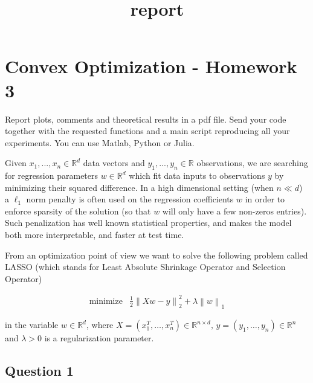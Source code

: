 \documentclass[11pt]{article}
\title{report}
\begin{document}
    
    \maketitle
    
    

    
    \hypertarget{convex-optimization---homework-3}{%
\section{Convex Optimization - Homework
3}\label{convex-optimization---homework-3}}

Report plots, comments and theoretical results in a pdf file. Send your
code together with the requested functions and a main script reproducing
all your experiments. You can use Matlab, Python or Julia.

Given \(x_1,...,x_n \in \mathbb{R}^d\) data vectors and
\(y_1,...,y_n \in \mathbb{R}\) observations, we are searching for
regression parameters \(w \in \mathbb{R}^d\) which fit data inputs to
observations \(y\) by minimizing their squared difference. In a high
dimensional setting (when \(n \ll d\)) a \(\ell_1\) norm penalty is
often used on the regression coefficients \(w\) in order to enforce
sparsity of the solution (so that \(w\) will only have a few non-zeros
entries). Such penalization has well known statistical properties, and
makes the model both more interpretable, and faster at test time.

From an optimization point of view we want to solve the following
problem called LASSO (which stands for Least Absolute Shrinkage Operator
and Selection Operator)

\begin{equation}
\tag{LASSO}
\begin{array}{ll}
\text{minimize} & \frac{1}{2} \left\lVert Xw - y \right\rVert^2_2 + \lambda \left\lVert w \right\rVert_1
\end{array}
\end{equation}

in the variable \(w \in \mathbb{R}^d\), where
\(X = (x^T_1, \ldots, x^T_n) \in \mathbb{R}^{n\times d},\, y = (y_1, \ldots, y_n) \in \mathbb{R}^n\)
and \(\lambda > 0\) is a regularization parameter.

    \hypertarget{question-1}{%
\subsection{Question 1}\label{question-1}}
\end{document}
